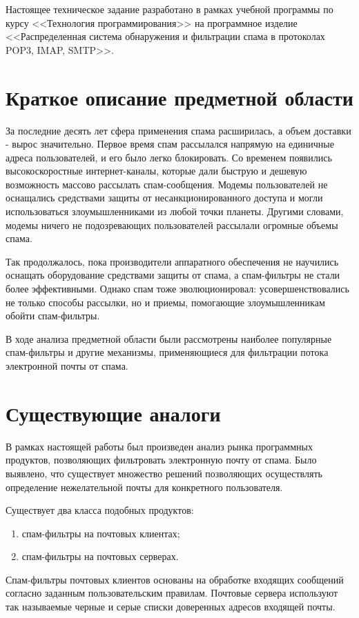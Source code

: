 \Introduction
Настоящее техническое задание разработано в рамках учебной программы по курсу <<Технология программирования>> на программное изделие <<Распределенная система обнаружения и фильтрации спама в протоколах POP3, IMAP, SMTP>>.


\section{Краткое описание предметной области}
За последние десять лет сфера применения спама расширилась, а объем доставки - вырос значительно. Первое время спам рассылался напрямую на единичные адреса пользователей, и его было легко блокировать. Со временем появились высокоскоростные интернет-каналы, которые дали быструю и дешевую возможность массово рассылать спам-сообщения. Модемы пользователей не оснащались средствами защиты от несанкционированного доступа и могли использоваться злоумышленниками из любой точки планеты. Другими словами, модемы ничего не подозревающих пользователей рассылали огромные объемы спама.

Так продолжалось, пока производители аппаратного обеспечения не научились оснащать оборудование средствами защиты от спама, а спам-фильтры не стали более эффективными. Однако спам тоже эволюционировал: усовершенствовались не только способы рассылки, но и приемы, помогающие злоумышленникам обойти спам-фильтры. 

В ходе анализа предметной области были рассмотрены наиболее популярные спам-фильтры и другие механизмы, применяющиеся для фильтрации потока электронной почты от спама.


\section{Существующие аналоги}
В рамках настоящей работы был произведен анализ рынка программных продуктов, позволяющих фильтровать электронную почту от спама. Было выявлено, что существует множество решений позволяющих осуществлять определение нежелательной почты для конкретного пользователя. 

Существует два класса подобных продуктов:
\begin{enumerate}
	\item спам-фильтры на почтовых клиентах;
	\item спам-фильтры на почтовых серверах. 
\end{enumerate}

Спам-фильтры почтовых клиентов основаны на обработке входящих сообщений согласно заданным пользовательским правилам.  Почтовые сервера используют так называемые черные и серые списки доверенных адресов входящей почты.

